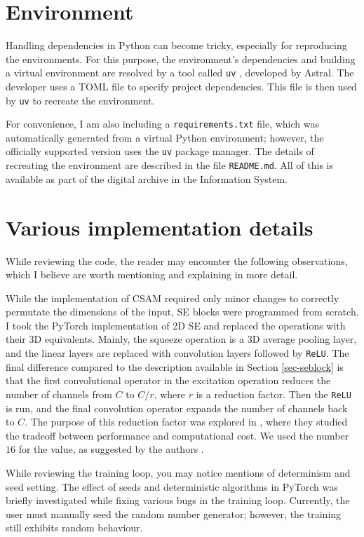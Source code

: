 \documentclass[
  digital,     %
  oneside,     %
  nosansbold,  %
  nocolorbold, %
  lof,         %
  lot,         %
]{fithesis4}
\begin{document}
\section{Environment}
Handling dependencies in Python can become tricky, especially for reproducing the environments. For this purpose, the environment's dependencies and building a virtual environment are resolved by a tool called \texttt{uv} \parencite{uv2025}, developed by Astral. The developer uses a TOML file to specify project dependencies. This file is then used by \texttt{uv} to recreate the environment.

For convenience, I am also including a \texttt{requirements.txt} file, which was automatically generated from a virtual Python environment; however, the officially supported version uses the \texttt {uv} package manager. The details of recreating the environment are described in the file \texttt{README.md}. All of this is available as part of the digital archive in the Information System.

\section{Various implementation details}
While reviewing the code, the reader may encounter the following observations, which I believe are worth mentioning and explaining in more detail.

While the implementation of CSAM required only minor changes to correctly permutate the dimensions of the input, SE blocks were programmed from scratch. I took the PyTorch implementation of 2D SE and replaced the operations with their 3D equivalents. Mainly, the squeeze operation is a 3D average pooling layer, and the linear layers are replaced with convolution layers followed by \texttt{ReLU}. The final difference compared to the description available in Section \ref{sec-seblock} is that the first convolutional operator in the excitation operation reduces the number of channels from $C$ to $C/r$, where $r$ is a reduction factor. Then the \texttt{ReLU} is run, and the final convolution operator expands the number of channels back to $C$. The purpose of this reduction factor was explored in \parencite{Hu2018}, where they studied the tradeoff between performance and computational cost. We used the number $16$ for the value, as suggested by the authors \parencite{Hu2018}.

While reviewing the training loop, you may notice mentions of determinism and seed setting. The effect of seeds and deterministic algorithms in PyTorch was briefly investigated while fixing various bugs in the training loop. Currently, the user must manually seed the random number generator; however, the training still exhibits random behaviour.
\end{document}
